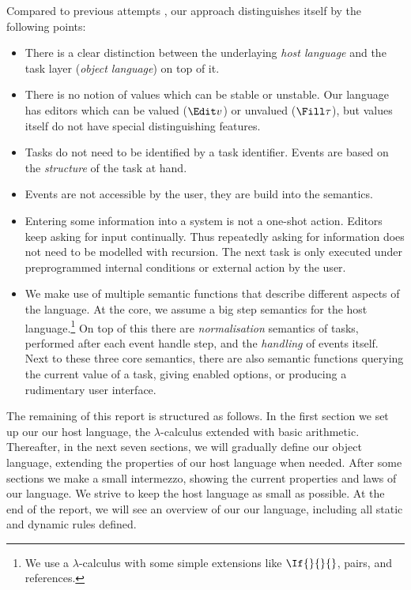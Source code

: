 Compared to previous attempts \cite{conf/ifl/KoopmanPA08,conf/ppdp/PlasmeijerLMAK12,thesis/radboud/VinterHviid18},
our approach distinguishes itself by the following points:
\begin{itemize}
  \item
    There is a clear distinction between the underlaying \emph{host language}
    and the task layer (\emph{object language}) on top of it.
  \item
    There is no notion of values which can be stable or unstable.
    Our language has editors which can be valued ($\Edit v$) or unvalued ($\Fill \tau$),
    but values itself do not have special distinguishing features.
  \item
    Tasks do not need to be identified by a task identifier.
    Events are based on the \emph{structure} of the task at hand.
  \item
    Events are not accessible by the user, they are build into the semantics.
  \item
    Entering some information into a system is not a one-shot action.
    Editors keep asking for input continually.
    Thus repeatedly asking for information does not need to be modelled with recursion.
    The next task is only executed under preprogrammed internal conditions or external action by the user.
  \item
    We make use of multiple semantic functions that describe different aspects of the language.
    At the core, we assume a big step semantics for the host language.\footnote{
      We use a $\lambda$-calculus with some simple extensions like $\If{}{}{}$, pairs, and references.}
    On top of this there are \emph{normalisation} semantics of tasks,
    performed after each event handle step,
    and the \emph{handling} of events itself.
    Next to these three core semantics,
    there are also semantic functions querying the current value of a task,
    giving enabled options,
    or producing a rudimentary user interface.
\end{itemize}

The remaining of this report is structured as follows.
In the first section we set up our our host language,
the $\lambda$-calculus extended with basic arithmetic.
Thereafter, in the next seven sections, we will gradually define our object language,
extending the properties of our host language when needed.
After some sections we make a small intermezzo,
showing the current properties and laws of our language.
We strive to keep the host language as small as possible.
At the end of the report,
we will see an overview of our our language,
including all static and dynamic rules defined.
